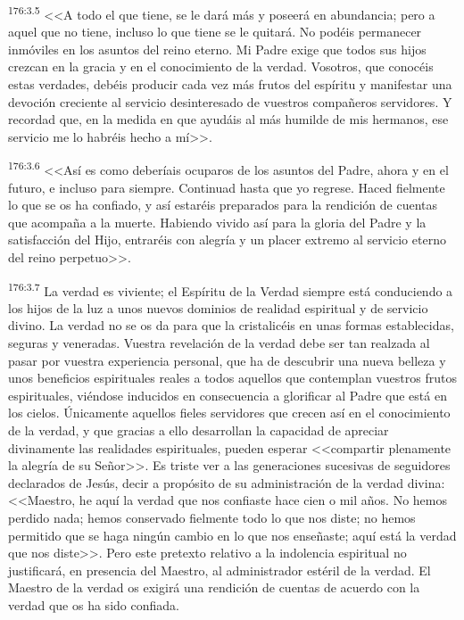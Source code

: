 \par 
\textsuperscript{176:3.5} <<A todo el que tiene, se le dará más y poseerá en abundancia; pero a aquel que no tiene, incluso lo que tiene se le quitará. No podéis permanecer inmóviles en los asuntos del reino eterno. Mi Padre exige que todos sus hijos crezcan en la gracia y en el conocimiento de la verdad. Vosotros, que conocéis estas verdades, debéis producir cada vez más frutos del espíritu y manifestar una devoción creciente al servicio desinteresado de vuestros compañeros servidores. Y recordad que, en la medida en que ayudáis al más humilde de mis hermanos, ese servicio me lo habréis hecho a mí>>.

\par 
\textsuperscript{176:3.6} <<Así es como deberíais ocuparos de los asuntos del Padre, ahora y en el futuro, e incluso para siempre. Continuad hasta que yo regrese. Haced fielmente lo que se os ha confiado, y así estaréis preparados para la rendición de cuentas que acompaña a la muerte. Habiendo vivido así para la gloria del Padre y la satisfacción del Hijo, entraréis con alegría y un placer extremo al servicio eterno del reino perpetuo>>.

\par 
\textsuperscript{176:3.7} La verdad es viviente; el Espíritu de la Verdad siempre está conduciendo a los hijos de la luz a unos nuevos dominios de realidad espiritual y de servicio divino. La verdad no se os da para que la cristalicéis en unas formas establecidas, seguras y veneradas. Vuestra revelación de la verdad debe ser tan realzada al pasar por vuestra experiencia personal, que ha de descubrir una nueva belleza y unos beneficios espirituales reales a todos aquellos que contemplan vuestros frutos espirituales, viéndose inducidos en consecuencia a glorificar al Padre que está en los cielos. Únicamente aquellos fieles servidores que crecen así en el conocimiento de la verdad, y que gracias a ello desarrollan la capacidad de apreciar divinamente las realidades espirituales, pueden esperar <<compartir plenamente la alegría de su Señor>>. Es triste ver a las generaciones sucesivas de seguidores declarados de Jesús, decir a propósito de su administración de la verdad divina: <<Maestro, he aquí la verdad que nos confiaste hace cien o mil años. No hemos perdido nada; hemos conservado fielmente todo lo que nos diste; no hemos permitido que se haga ningún cambio en lo que nos enseñaste; aquí está la verdad que nos diste>>. Pero este pretexto relativo a la indolencia espiritual no justificará, en presencia del Maestro, al administrador estéril de la verdad. El Maestro de la verdad os exigirá una rendición de cuentas de acuerdo con la verdad que os ha sido confiada.


